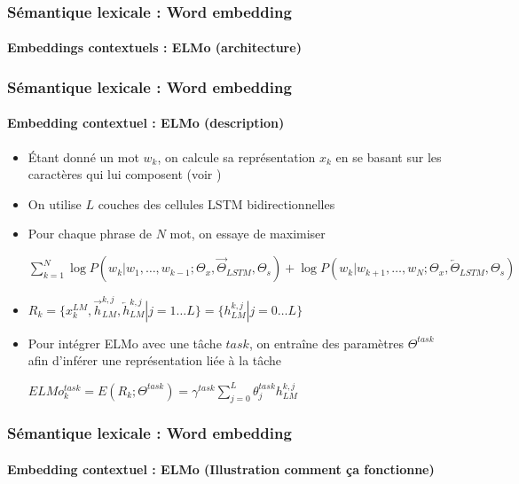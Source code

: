 \documentclass[xcolor=table]{beamer}
\begin{document}
\begin{frame}
\frametitle{Sémantique lexicale : Word embedding}
\framesubtitle{Embeddings contextuels : ELMo (architecture)}
	
	
\end{frame}

\begin{frame}
\frametitle{Sémantique lexicale : Word embedding}
\framesubtitle{Embedding contextuel : ELMo (description)}

\begin{itemize}
	\item Étant donné un mot $w_k$, on calcule sa représentation $x_k$ en se basant sur les caractères qui lui composent (voir \cite{2015-kim-al})
	\item On utilise $L$ couches des cellules LSTM bidirectionnelles 
	\item Pour chaque  phrase de $N$ mot, on essaye de maximiser\\ 
	\begin{center}
		$\sum_{k=1}^{N} 
	\log P(w_k | w_1,\ldots,w_{k-1}; \Theta_x, \overrightarrow{\Theta}_{LSTM}, \Theta_s)
	+
	\log P(w_k | w_{k+1},\ldots,w_{N}; \Theta_x, \overleftarrow{\Theta}_{LSTM}, \Theta_s)
	$
	\end{center}
	
	\item $R_k = \{x_k^{LM}, \overrightarrow{h}_{LM}^{k, j}, \overleftarrow{h}_{LM}^{k, j} | j= 1 \ldots L \}
	= \{h_{LM}^{k, j} | j= 0 \ldots L \}
	$
	
	\item Pour intégrer ELMo avec une tâche  $task$, on entraîne des paramètres $\Theta^{task}$ afin d'inférer une représentation liée à la tâche \\
	\begin{center}
		$ELMo_k^{task} = E(R_k; \Theta^{task}) = \gamma^{task} \sum_{j=0}^{L} \theta_j^{task} h_{LM}^{k, j}$
	\end{center}
\end{itemize}

\end{frame}

\begin{frame}
\frametitle{Sémantique lexicale : Word embedding}
\framesubtitle{Embedding contextuel : ELMo (Illustration comment ça fonctionne)}

\vspace{-3pt}
\begin{center}
\end{center}
	
\end{frame}
\end{document}
